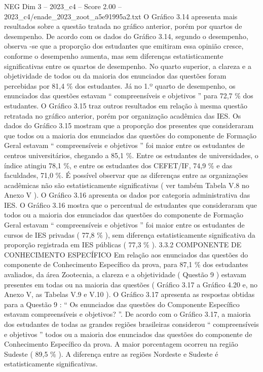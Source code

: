 \begin{textsample}{NEG Dim 3 – 2023\_c4 – Score 2.00 – 2023\_c4/enade\_2023\_zoot\_a5e91995a2.txt}
O Gráfico 3.14 apresenta mais resultados sobre a questão tratada no gráfico anterior, porém por quartos de desempenho.
De acordo com os dados do Gráfico 3.14, segundo o desempenho, observa -se que a proporção dos estudantes que emitiram essa opinião cresce, conforme o desempenho aumenta, mas sem diferenças estatisticamente significativas entre os quartos de desempenho.
No quarto superior, a clareza e a objetividade de todos ou da maioria dos enunciados das questões foram percebidas por 81,4 \% dos estudantes.
Já no 1.º quarto de desempenho, os enunciados das questões estavam “ compreensíveis e objetivos ” para 72,7 \% dos estudantes.
O Gráfico 3.15 traz outros resultados em relação à mesma questão retratada no gráfico anterior, porém por organização acadêmica das IES.
Os dados do Gráfico 3.15 mostram que a proporção dos presentes que consideraram que todos ou a maioria dos enunciados das questões do componente de Formação Geral estavam “ compreensíveis e objetivos ” foi maior entre os estudantes de centros universitários, chegando a 85,1 \%.
Entre os estudantes de universidades, o índice atingiu 78,1 \%, e entre os estudantes dos CEFET/IF, 74,9 \% e das faculdades, 71,0 \%.
É possível observar que as diferenças entre as organizações acadêmicas não são estatisticamente significativas ( ver também Tabela V.8 no Anexo V ).
O Gráfico 3.16 apresenta os dados por categoria administrativa das IES.
O Gráfico 3.16 mostra que o percentual de estudantes que consideraram que todos ou a maioria dos enunciados das questões do componente de Formação Geral estavam “ compreensíveis e objetivos ” foi maior entre os estudantes de cursos de IES privadas ( 77,8 \% ), sem diferença estatisticamente significativa da proporção registrada em IES públicas ( 77,3 \% ). 3.3.2 COMPONENTE DE CONHECIMENTO ESPECÍFICO Em relação aos enunciados das questões do componente de Conhecimento Específico da prova, para 87,1 \% dos estudantes avaliados, da área Zootecnia, a clareza e a objetividade ( Questão 9 ) estavam presentes em todas ou na maioria das questões ( Gráfico 3.17 a Gráfico 4.20 e, no Anexo V, as Tabelas V.9 e V.10 ).
O Gráfico 3.17 apresenta as respostas obtidas para a Questão 9 : “ Os enunciados das questões do Componente Específico estavam compreensíveis e objetivos? ”.
De acordo com o Gráfico 3.17, a maioria dos estudantes de todas as grandes regiões brasileiras considerou “ compreensíveis e objetivos ” todos ou a maioria dos enunciados das questões do componente de Conhecimento Específico da prova.
A maior porcentagem ocorreu na região Sudeste ( 89,5 \% ).
A diferença entre as regiões Nordeste e Sudeste é estatisticamente significativas.

\end{textsample}
